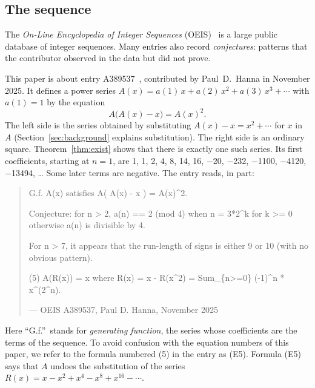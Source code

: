 \documentclass[11pt,a4paper]{article}
\theoremstyle{definition}
\theoremstyle{remark}
\begin{document}
\subsection{The sequence}\label{sec:sequence}
The \emph{On-Line Encyclopedia of Integer Sequences} (OEIS)~\cite{oeisdb} is a large public database of integer
sequences. Many
entries also record \emph{conjectures}: patterns that the contributor observed in the data but did not prove.

This paper is about entry A389537~\cite{oeis}, contributed by Paul~D.~Hanna in November 2025. It defines a power
series $A(x)=a(1)\,x+a(2)\,x^2+a(3)\,x^3+\cdots$ with $a(1)=1$ by the equation
\begin{equation}\label{eq:oeis}
A\bigl(A(x)-x\bigr)=A(x)^2 .
\end{equation}
The left side is the series obtained by substituting $A(x)-x=x^2+\cdots$ for $x$ in $A$
(Section~\ref{sec:background} explains substitution). The right side is an ordinary square. Theorem~\ref{thm:exist} shows that there is exactly one such series.
Its first coefficients, starting at $n=1$, are 1, 1, 2, 4, 8, 14, 16, $-$20, $-$232, $-$1100, $-$4120, $-$13494, \dots{} Some later terms
are negative. The entry reads, in part:
\begin{quote}\small\ttfamily\raggedright G.f. A(x) satisfies A( A(x) - x ) = A(x)\^{}2.\par\smallskip Conjecture: for n > 2, a(n) == 2 (mod 4) when n = 3*2\^{}k for k >= 0 otherwise a(n) is divisible by 4.\par\smallskip For n > 7, it appears that the run-length of signs is either 9 or 10 (with no obvious pattern).\par\smallskip (5) A(R(x)) = x where R(x) = x - R(x\^{}2) = Sum\_\{n>=0\} (-1)\^{}n * x\^{}(2\^{}n).\par\smallskip\hfill\textrm{--- OEIS A389537, Paul D. Hanna, November 2025}\end{quote}

Here ``G.f.''\ stands for \emph{generating function}, the series whose coefficients are the terms of the sequence.
To avoid confusion with the equation numbers of this paper, we refer to the formula numbered (5) in the entry as (E5).
Formula (E5) says that $A$ undoes the substitution of the series $R(x)=x-x^2+x^4-x^8+x^{16}-\cdots$.
\end{document}
